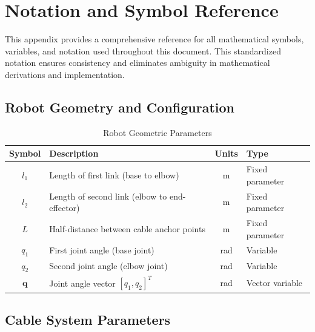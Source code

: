 \appendix
\section{Notation and Symbol Reference}

This appendix provides a comprehensive reference for all mathematical symbols, variables, and notation used throughout this document. This standardized notation ensures consistency and eliminates ambiguity in mathematical derivations and implementation.

\subsection{Robot Geometry and Configuration}

\begin{table}[h!]
\centering
\caption{Robot Geometric Parameters}
\begin{tabular}{|c|l|c|l|}
\hline
\textbf{Symbol} & \textbf{Description} & \textbf{Units} & \textbf{Type} \\
\hline
$l_1$ & Length of first link (base to elbow) & m & Fixed parameter \\
$l_2$ & Length of second link (elbow to end-effector) & m & Fixed parameter \\
$L$ & Half-distance between cable anchor points & m & Fixed parameter \\
$q_1$ & First joint angle (base joint) & rad & Variable \\
$q_2$ & Second joint angle (elbow joint) & rad & Variable \\
$\bm{q}$ & Joint angle vector $[q_1, q_2]^T$ & rad & Vector variable \\
\hline
\end{tabular}
\end{table}

\subsection{Cable System Parameters}

